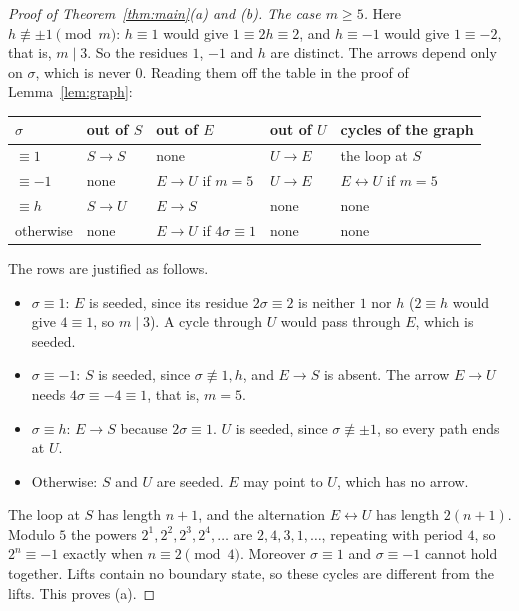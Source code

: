 \documentclass[11pt]{amsart}
\theoremstyle{definition}
\theoremstyle{remark}
\begin{document}
\begin{proof}[Proof of Theorem~\ref{thm:main}\textup{(a)} and \textup{(b)}]
\emph{The case $m\ge5$.} Here $h\not\equiv\pm1\pmod m$: $h\equiv1$ would give $1\equiv2h\equiv2$, and $h\equiv-1$ would give $1\equiv-2$, that is, $m\mid3$. So the residues $1$, $-1$ and $h$ are distinct. The arrows depend only on $\sigma$, which is never $0$. Reading them off the table in the proof of Lemma~\ref{lem:graph}:
\begin{center}
\renewcommand{\arraystretch}{1.15}
\begin{tabular}{@{}lllll@{}}
\toprule
$\sigma$ & out of $S$ & out of $E$ & out of $U$ & cycles of the graph\\
\midrule
$\equiv1$ & $S\to S$ & none & $U\to E$ & the loop at $S$\\
$\equiv-1$ & none & $E\to U$ if $m=5$ & $U\to E$ & $E\leftrightarrow U$ if $m=5$\\
$\equiv h$ & $S\to U$ & $E\to S$ & none & none\\
otherwise & none & $E\to U$ if $4\sigma\equiv1$ & none & none\\
\bottomrule
\end{tabular}
\end{center}
The rows are justified as follows.
\begin{itemize}
\item $\sigma\equiv1$: $E$ is seeded, since its residue $2\sigma\equiv2$ is neither $1$ nor $h$ ($2\equiv h$ would give $4\equiv1$, so $m\mid3$). A cycle through $U$ would pass through $E$, which is seeded.
\item $\sigma\equiv-1$: $S$ is seeded, since $\sigma\not\equiv1,h$, and $E\to S$ is absent. The arrow $E\to U$ needs $4\sigma\equiv-4\equiv1$, that is, $m=5$.
\item $\sigma\equiv h$: $E\to S$ because $2\sigma\equiv1$. $U$ is seeded, since $\sigma\not\equiv\pm1$, so every path ends at $U$.
\item Otherwise: $S$ and $U$ are seeded. $E$ may point to $U$, which has no arrow.
\end{itemize}
The loop at $S$ has length $n+1$, and the alternation $E\leftrightarrow U$ has length $2(n+1)$. Modulo $5$ the powers $2^1,2^2,2^3,2^4,\dots$ are $2,4,3,1,\dots$, repeating with period $4$, so $2^n\equiv-1$ exactly when $n\equiv2\pmod4$. Moreover $\sigma\equiv1$ and $\sigma\equiv-1$ cannot hold together. Lifts contain no boundary state, so these cycles are different from the lifts. This proves (a).


\end{proof}
\end{document}
